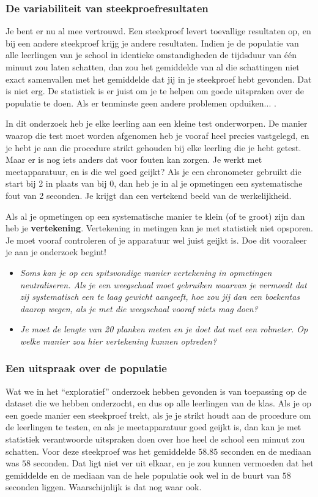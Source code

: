 \documentclass[11pt]{article}
\newcommand{\vraag}[2]{\begin{itemize}\item {\it #1} \vspace*{#2}\end{itemize}}
\begin{document}
\subsubsection{De variabiliteit van steekproefresultaten}

Je bent er nu al mee vertrouwd. Een steekproef levert toevallige resultaten op, en bij een andere
steekproef krijg je andere resultaten. Indien je de populatie van alle leerlingen van je school in
identieke omstandigheden de tijdsduur van één minuut zou laten schatten, dan zou het gemiddelde
van al die schattingen niet exact samenvallen met het gemiddelde dat jij in je steekproef hebt
gevonden. Dat is niet erg. De statistiek is er juist om je te helpen om goede uitspraken over de
populatie te doen. Als er tenminste geen andere problemen opduiken... .

In dit onderzoek heb je elke leerling aan een kleine test onderworpen. De manier waarop die test
moet worden afgenomen heb je vooraf heel precies vastgelegd, en je hebt je aan die procedure strikt
gehouden bij elke leerling die je hebt getest. Maar er is nog iets anders dat voor fouten kan zorgen.
Je werkt met meetapparatuur, en is die wel goed geijkt? Als je een chronometer gebruikt die start bij
2 in plaats van bij 0, dan heb je in al je opmetingen een systematische fout van 2 seconden. Je krijgt
dan een vertekend beeld van de werkelijkheid.

Als al je opmetingen op een systematische manier te klein (of te groot) zijn dan heb je {\bf vertekening}.
Vertekening in metingen kan je met statistiek niet opsporen. Je moet vooraf controleren of je
apparatuur wel juist geijkt is. Doe dit vooraleer je aan je onderzoek begint!

\vraag{Soms kan je op een spitsvondige manier vertekening in opmetingen neutraliseren. Als je een
weegschaal moet gebruiken waarvan je vermoedt dat zij systematisch een te laag gewicht
aangeeft, hoe zou jij dan een boekentas daarop wegen, als je met die weegschaal vooraf niets
mag doen?}{4cm}

\vraag{Je moet de lengte van 20 planken meten en je doet dat met een rolmeter. Op welke manier
zou hier vertekening kunnen optreden?}{3cm}

\subsubsection{Een uitspraak over de populatie}

Wat we in het “exploratief” onderzoek hebben gevonden is van toepassing op de dataset die we hebben
onderzocht, en dus op alle leerlingen van de klas. Als je op een goede manier een steekproef trekt, als je je
strikt houdt aan de procedure om de leerlingen te testen, en als je meetapparatuur goed geijkt is, dan
kan je met statistiek verantwoorde uitspraken doen over hoe heel de school een minuut zou schatten.
Voor deze steekproef was het gemiddelde $58.85$ seconden en de mediaan was $58$ seconden. Dat ligt
niet ver uit elkaar, en je zou kunnen vermoeden dat het gemiddelde en de mediaan van de hele
populatie ook wel in de buurt van $58$ seconden liggen. Waarschijnlijk is dat nog waar ook.
\end{document}
